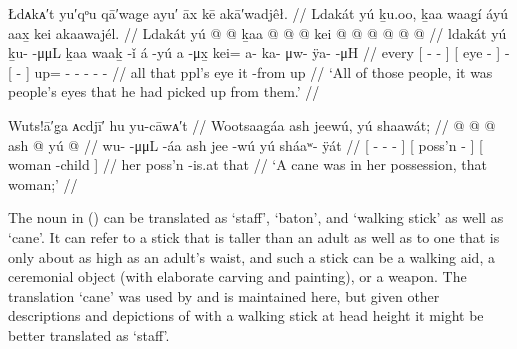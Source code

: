 
\ex\label{ex:94-15-picked-up-peoples-eyes}%
%
\begingl
	\glpreamble	Łdᴀkᴀ′t yu′qᵒu qā′wag̣e ayu′ āx kē akā′wadjêł. //
	\glpreamble	Ldakát yú ḵu.oo, ḵaa waag̱í áyú aax̱ kei akaawajél. //
	\gla	Ldakát {} yú  @ {} @ {} {}
		{} ḵaa  @ {} {}
		 @ {}
		{}  @ {} {}
		kei @  @ {} @ {} @ {} @ {} @ {} //
	\glb	ldakát {} yú ḵu-  -μμL {}
		{} ḵaa waaḵ -ǐ {}
		á -yú
		{} a -μx̱ {}
		kei= a- ka- μw- ÿa-  -μH //
	\glc	every {}[  -  - {}]
		{}[  eye - {}]
		 -
		{}[  - {}]
		up= - - - -  - //
	\gld	all {} that  {} {} {}
		{} ppl’s eye {} {}
		 {}
		{} it -from {}
		up\•  {} {} {} {} {} //
	\glft	‘All of those people, it was people’s eyes that he had picked up from them.’
		//
\endgl
\xe


\ex\label{ex:94-16-she-had-a-cane}%
%
\begingl
	\glpreamble	Wuts!ā′g̣a ᴀcdjī′ hu yu-cāwᴀ′t //
	\glpreamble	Wootsaag̱áa ash jeewú, yú shaawát; //
	\gla	{}  @ {} @ {} @ {} {}
		{} ash  @ {} {}
		{} yú  @ {} {} //
	\glb	{} wu-  -μμL -áa {}
		{} ash jee -wú {}
		{} yú sháaʷ- ÿát {} //
	\glc	{}[ -  - - {}]
		{}[  poss’n - {}]
		{}[  woman -child {}] //
	\gld	{}  {} {} {} {}
		{} her poss’n -is.at {}
		{} that  {} {} //
	\glft	‘A cane was in her possession, that woman;’
		//
\endgl
\xe

The noun  in (\lastx) can be translated as ‘staff’, ‘baton’, and ‘walking stick’ as well as ‘cane’.
It can refer to a stick that is taller than an adult as well as to one that is only about as high as an adult’s waist, and such a stick can be a walking aid, a ceremonial object (with elaborate carving and painting), or a weapon.
The translation ‘cane’ was used by \citeauthor{swanton:1909} and is maintained here, but given other descriptions and depictions of  with a walking stick at head height it might be better translated as ‘staff’.

